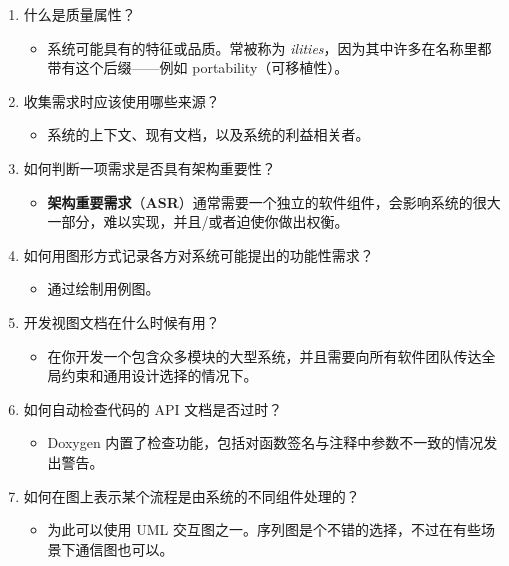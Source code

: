 \begin{enumerate}
\item 什么是质量属性？

\begin{itemize}
\item 系统可能具有的特征或品质。常被称为 \emph{ilities}，因为其中许多在名称里都带有这个后缀——例如 portability（可移植性）。
\end{itemize}
\item 收集需求时应该使用哪些来源？

\begin{itemize}
\item 系统的上下文、现有文档，以及系统的利益相关者。
\end{itemize}
\item 如何判断一项需求是否具有架构重要性？

\begin{itemize}
\item \textbf{架构重要需求}（\textbf{ASR}）通常需要一个独立的软件组件，会影响系统的很大一部分，难以实现，并且/或者迫使你做出权衡。
\end{itemize}
\item 如何用图形方式记录各方对系统可能提出的功能性需求？

\begin{itemize}
\item 通过绘制用例图。
\end{itemize}
\item 开发视图文档在什么时候有用？

\begin{itemize}
\item 在你开发一个包含众多模块的大型系统，并且需要向所有软件团队传达全局约束和通用设计选择的情况下。
\end{itemize}
\item 如何自动检查代码的 API 文档是否过时？

\begin{itemize}
\item Doxygen 内置了检查功能，包括对函数签名与注释中参数不一致的情况发出警告。
\end{itemize}
\item 如何在图上表示某个流程是由系统的不同组件处理的？

\begin{itemize}
\item 为此可以使用 UML 交互图之一。序列图是个不错的选择，不过在有些场景下通信图也可以。
\end{itemize}
\end{enumerate}

